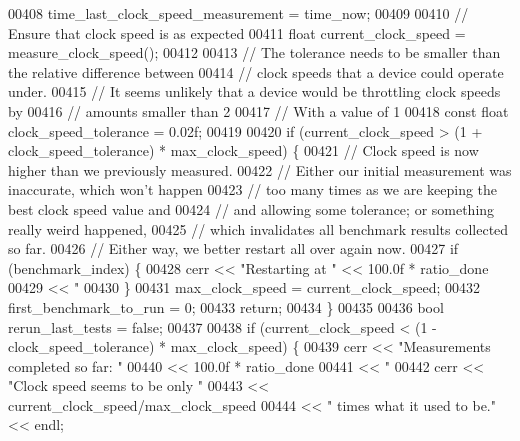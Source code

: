 \begin{DoxyCode}
00408       time\_last\_clock\_speed\_measurement = time\_now;
00409 
00410       \textcolor{comment}{// Ensure that clock speed is as expected}
00411       \textcolor{keywordtype}{float} current\_clock\_speed = measure\_clock\_speed();
00412 
00413       \textcolor{comment}{// The tolerance needs to be smaller than the relative difference between}
00414       \textcolor{comment}{// clock speeds that a device could operate under.}
00415       \textcolor{comment}{// It seems unlikely that a device would be throttling clock speeds by}
00416       \textcolor{comment}{// amounts smaller than 2%
00417       \textcolor{comment}{// With a value of 1%
00418       \textcolor{keyword}{const} \textcolor{keywordtype}{float} clock\_speed\_tolerance = 0.02f;
00419 
00420       \textcolor{keywordflow}{if} (current\_clock\_speed > (1 + clock\_speed\_tolerance) * max\_clock\_speed) \{
00421         \textcolor{comment}{// Clock speed is now higher than we previously measured.}
00422         \textcolor{comment}{// Either our initial measurement was inaccurate, which won't happen}
00423         \textcolor{comment}{// too many times as we are keeping the best clock speed value and}
00424         \textcolor{comment}{// and allowing some tolerance; or something really weird happened,}
00425         \textcolor{comment}{// which invalidates all benchmark results collected so far.}
00426         \textcolor{comment}{// Either way, we better restart all over again now.}
00427         \textcolor{keywordflow}{if} (benchmark\_index) \{
00428           cerr << \textcolor{stringliteral}{"Restarting at "} << 100.0f * ratio\_done
00429                << \textcolor{stringliteral}{" %
00430         \}
00431         max\_clock\_speed = current\_clock\_speed;
00432         first\_benchmark\_to\_run = 0;
00433         \textcolor{keywordflow}{return};
00434       \}
00435 
00436       \textcolor{keywordtype}{bool} rerun\_last\_tests = \textcolor{keyword}{false};
00437 
00438       \textcolor{keywordflow}{if} (current\_clock\_speed < (1 - clock\_speed\_tolerance) * max\_clock\_speed) \{
00439         cerr << \textcolor{stringliteral}{"Measurements completed so far: "}
00440              << 100.0f * ratio\_done
00441              << \textcolor{stringliteral}{" %
00442         cerr << \textcolor{stringliteral}{"Clock speed seems to be only "}
00443              << current\_clock\_speed/max\_clock\_speed
00444              << \textcolor{stringliteral}{" times what it used to be."} << endl;
}}}}
\end{DoxyCode}
